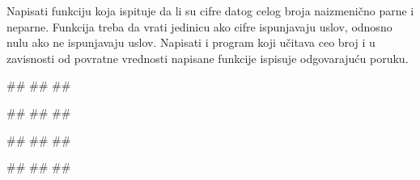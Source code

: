 \begin{Exercise}[label=FUN_17] 
Napisati funkciju  koja ispituje da li su
cifre datog celog broja naizmenično parne i neparne. Funkcija treba da
vrati jedinicu ako cifre ispunjavaju uslov, odnosno nulu ako ne
ispunjavaju uslov. Napisati i program koji učitava ceo broj i 
u zavisnosti od povratne vrednosti napisane funkcije
ispisuje odgovarajuću poruku.
  
\begin{miditest}
\begin{upotreba}{1}
#\naslovInt#
##
##
\end{upotreba}
\end{miditest}
\begin{miditest}
\begin{upotreba}{2}
#\naslovInt#
##
##
\end{upotreba}
\end{miditest}

\begin{miditest}
\begin{upotreba}{3}
#\naslovInt#
##
##
\end{upotreba}
\end{miditest}
\begin{miditest}
\begin{upotreba}{4}
#\naslovInt#
##
##
\end{upotreba}
\end{miditest}

\end{Exercise}
\ifresenja 
\begin{Answer}[ref=FUN_17]
\end{Answer} 
\fi


